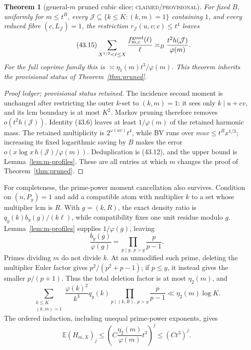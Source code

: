 \documentclass[10pt,reqno]{amsart}
\newtheorem{theorem}{Theorem}[section]
\theoremstyle{definition}
\newcommand{\1}{\mathbf 1}
\begin{document}
\begin{theorem}[general-$m$ pruned cubic slice; \textsc{claimed/provisional}]
\label{thm:m-pruned}
For fixed $B$, uniformly for $m\leq t^B$, every
$\mathcal J\subseteq\{k\leq K:(k,m)=1\}$ containing $1$, and every reduced
fibre $(c,L_{\mathcal J})=1$, the restriction
$r_{\mathcal J}(u,v;c)\leq t^4$ leaves
\begin{equation}\tag{43.15}
 \sum_{X^{1/2}<\ell\leq X}\frac{f^{\rm good}_{m,c}(\ell)}\ell
 \asymp_B\frac{t^2h(\mathcal J)}{\varphi(m)}.
\end{equation}
For the full coprime family this is
$\asymp\eta_1(m)t^3/\varphi(m)$.  This theorem inherits the provisional
status of Theorem~\ref{thm:pruned}.
\end{theorem}
\begin{proof}[Proof ledger; provisional status retained]
The incidence second moment is unchanged after restricting the outer
$k$-set to $(k,m)=1$: it sees only $k\mid u+cv$, and its lcm boundary is
at most $K^2$.  Markov pruning therefore removes
$o(t^2h(\mathcal J))$.  Identity (43.6) leaves at least
$1/\varphi(m)$ of the retained harmonic mass.  The retained multiplicity is
$2^{\omega(uv)}t^4$, while BV runs over $muv\leq t^Bx^{1/3}$; increasing
its fixed logarithmic saving by $B$ makes the error
$o(x\log x\,h(\mathcal J)/\varphi(m))$.  Deduplication is (43.12), and the
upper bound is Lemma~\ref{lem:m-profiles}.  These are all entries at which
$m$ changes the proof of Theorem~\ref{thm:pruned}.
\end{proof}

For completeness, the prime-power moment cancellation also survives.
Condition on $(n,P_y)=1$ and add a compatible atom with multiplier $k$ to a
set whose multiplier lcm is $R$.  With $g=(k,R)$, the exact density ratio is
$q_y(k)b_y(g)/(k\ell)$, while compatibility fixes one unit residue modulo
$g$.  Lemma~\ref{lem:m-profiles} supplies $1/\varphi(g)$, leaving
\begin{equation}\tag{43.16}
 \frac{b_y(g)}{\varphi(g)}
 =\prod_{p\mid g,\ p>y}\frac p{p-1}.
\end{equation}
Primes dividing $m$ do not divide $k$.  At an unmodified such prime, deleting
the multiplier Euler factor gives $p^2/(p^2+p-1)$; if $p\leq y$, it instead
gives the smaller $p/(p+1)$.  Thus the total deletion factor is at most
$\eta_2(m)$, and
\begin{equation}\tag{43.17}
 \sum_{\substack{k\leq K\\(k,m)=1}}
 \frac{\varphi(k)^2}{k^3}q_y(k)
 \prod_{p\mid(k,R),\ p>y}\frac p{p-1}
 \ll\eta_2(m)\log K.
\end{equation}
The ordered induction, including unequal prime-power exponents, gives
\begin{equation}\tag{43.18}
 \mathbb E(H_{m,X})_j\leq
 \left(C\frac{\eta_2(m)}{\varphi(m)}t^3\right)^j
 \leq(Ct^3)^j.
\end{equation}
\end{document}
